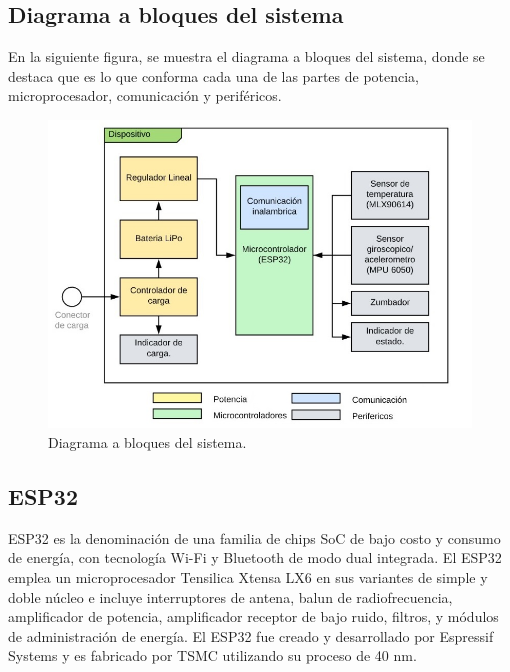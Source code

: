 \subsection{Diagrama a bloques del sistema}
En la siguiente figura, se muestra el diagrama a bloques del sistema, donde se destaca que es lo que
conforma cada una de las partes de potencia, microprocesador, comunicación y periféricos.
\begin{figure}[htp]
    \centering
    \includegraphics[width=\columnwidth]{system_block_diagram.png}
    \caption{Diagrama a bloques del sistema.}
\end{figure}

\subsection{ESP32}
ESP32 es la denominación de una familia de chips SoC de bajo costo y consumo de energía, con tecnología Wi-Fi
y Bluetooth de modo dual integrada. El ESP32 emplea un microprocesador Tensilica Xtensa LX6 en sus variantes
de simple y doble núcleo e incluye interruptores de antena, balun de radiofrecuencia, amplificador de potencia,
amplificador receptor de bajo ruido, filtros, y módulos de administración de energía. El ESP32 fue creado y
desarrollado por Espressif Systems y es fabricado por TSMC utilizando su proceso de 40 nm.

